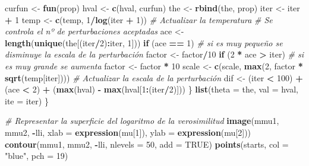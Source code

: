 \documentclass[
]{book}
\newenvironment{Shaded}{\begin{snugshade}}{\end{snugshade}}
\newcommand{\CommentTok}[1]{\textcolor[rgb]{0.56,0.35,0.01}{\textit{#1}}}
\newcommand{\ControlFlowTok}[1]{\textcolor[rgb]{0.13,0.29,0.53}{\textbf{#1}}}
\newcommand{\DataTypeTok}[1]{\textcolor[rgb]{0.13,0.29,0.53}{#1}}
\newcommand{\DecValTok}[1]{\textcolor[rgb]{0.00,0.00,0.81}{#1}}
\newcommand{\KeywordTok}[1]{\textcolor[rgb]{0.13,0.29,0.53}{\textbf{#1}}}
\newcommand{\NormalTok}[1]{#1}
\newcommand{\OperatorTok}[1]{\textcolor[rgb]{0.81,0.36,0.00}{\textbf{#1}}}
\newcommand{\OtherTok}[1]{\textcolor[rgb]{0.56,0.35,0.01}{#1}}
\newcommand{\StringTok}[1]{\textcolor[rgb]{0.31,0.60,0.02}{#1}}
\theoremstyle{break}
\theoremstyle{definition}
\theoremstyle{definition}
\theoremstyle{definition}
\theoremstyle{remark}
\begin{document}
\begin{Shaded}
\begin{Highlighting}[]
\NormalTok{    curfun <-}\StringTok{ }\KeywordTok{fun}\NormalTok{(prop)}
\NormalTok{    hval <-}\StringTok{ }\KeywordTok{c}\NormalTok{(hval, curfun)}
\NormalTok{    the <-}\StringTok{ }\KeywordTok{rbind}\NormalTok{(the, prop)}
\NormalTok{    iter <-}\StringTok{ }\NormalTok{iter }\OperatorTok{+}\StringTok{ }\DecValTok{1}
\NormalTok{    temp <-}\StringTok{ }\KeywordTok{c}\NormalTok{(temp, }\DecValTok{1}\OperatorTok{/}\KeywordTok{log}\NormalTok{(iter }\OperatorTok{+}\StringTok{ }\DecValTok{1}\NormalTok{))  }\CommentTok{# Actualizar la temperatura}
    \CommentTok{# Se controla el nº de perturbaciones aceptadas}
\NormalTok{    ace <-}\StringTok{ }\KeywordTok{length}\NormalTok{(}\KeywordTok{unique}\NormalTok{(the[(iter}\OperatorTok{/}\DecValTok{2}\NormalTok{)}\OperatorTok{:}\NormalTok{iter, }\DecValTok{1}\NormalTok{]))}
    \ControlFlowTok{if}\NormalTok{ (ace }\OperatorTok{==}\StringTok{ }\DecValTok{1}\NormalTok{) }
      \CommentTok{# si es muy pequeño se disminuye la escala de la perturbación}
\NormalTok{      factor <-}\StringTok{ }\NormalTok{factor}\OperatorTok{/}\DecValTok{10}
    \ControlFlowTok{if}\NormalTok{ (}\DecValTok{2} \OperatorTok{*}\StringTok{ }\NormalTok{ace }\OperatorTok{>}\StringTok{ }\NormalTok{iter) }
      \CommentTok{# si es muy grande se aumenta}
\NormalTok{      factor <-}\StringTok{ }\NormalTok{factor }\OperatorTok{*}\StringTok{ }\DecValTok{10}
\NormalTok{    scale <-}\StringTok{ }\KeywordTok{c}\NormalTok{(scale, }\KeywordTok{max}\NormalTok{(}\DecValTok{2}\NormalTok{, factor }\OperatorTok{*}\StringTok{ }\KeywordTok{sqrt}\NormalTok{(temp[iter])))  }\CommentTok{# Actualizar la escala de la perturbación}
\NormalTok{    dif <-}\StringTok{ }\NormalTok{(iter }\OperatorTok{<}\StringTok{ }\DecValTok{100}\NormalTok{) }\OperatorTok{+}\StringTok{ }\NormalTok{(ace }\OperatorTok{<}\StringTok{ }\DecValTok{2}\NormalTok{) }\OperatorTok{+}\StringTok{ }\NormalTok{(}\KeywordTok{max}\NormalTok{(hval) }\OperatorTok{-}\StringTok{ }\KeywordTok{max}\NormalTok{(hval[}\DecValTok{1}\OperatorTok{:}\NormalTok{(iter}\OperatorTok{/}\DecValTok{2}\NormalTok{)]))}
\NormalTok{  \}}
  \KeywordTok{list}\NormalTok{(}\DataTypeTok{theta =}\NormalTok{ the, }\DataTypeTok{val =}\NormalTok{ hval, }\DataTypeTok{ite =}\NormalTok{ iter)}
\NormalTok{\}}

\CommentTok{# Representar la superficie del logaritmo de la verosimilitud}
\KeywordTok{image}\NormalTok{(mmu1, mmu2, }\OperatorTok{-}\NormalTok{lli, }\DataTypeTok{xlab =} \KeywordTok{expression}\NormalTok{(mu[}\DecValTok{1}\NormalTok{]), }\DataTypeTok{ylab =} \KeywordTok{expression}\NormalTok{(mu[}\DecValTok{2}\NormalTok{]))}
\KeywordTok{contour}\NormalTok{(mmu1, mmu2, }\OperatorTok{-}\NormalTok{lli, }\DataTypeTok{nlevels =} \DecValTok{50}\NormalTok{, }\DataTypeTok{add =} \OtherTok{TRUE}\NormalTok{)}
\KeywordTok{points}\NormalTok{(starts, }\DataTypeTok{col =} \StringTok{"blue"}\NormalTok{, }\DataTypeTok{pch =} \DecValTok{19}\NormalTok{)}


\end{Highlighting}
\end{Shaded}
\end{document}
